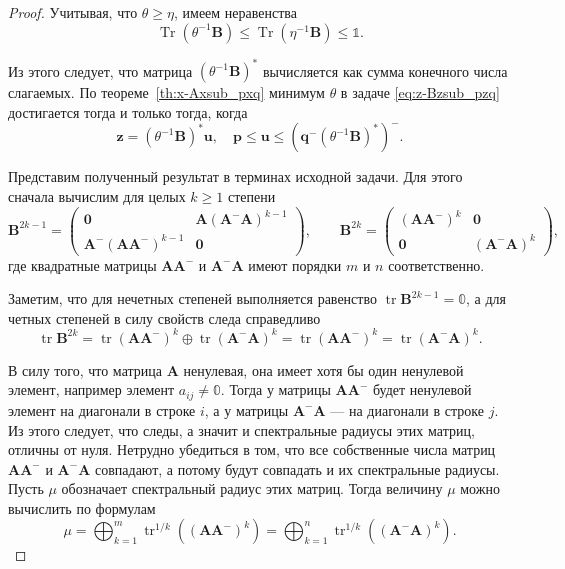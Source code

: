 \documentclass[specialist,
               substylefile = spbu.rtx,
               subf,href,colorlinks=true, 12pt]{disser}
\DeclareMathOperator{\tr}{tr}
\DeclareMathOperator{\Tr}{Tr}
\theoremstyle{definition}
\begin{document}
\begin{proof}
Учитывая, что $\theta\geq\eta$, имеем неравенства 
\begin{equation*}
\Tr(\theta^{-1}\bm{B})\leq\Tr(\eta^{-1}\bm{B})\leq\mathbb{1}.
\end{equation*}

Из этого следует, что матрица $(\theta^{-1}\bm{B})^{\ast}$ вычисляется как сумма конечного числа слагаемых. 
По теореме~\ref{th:x-Axsub_pxq} минимум $\theta$ в задаче \eqref{eq:z-Bzsub_pzq} достигается тогда и только тогда, когда 
\begin{equation}
\label{eq:z=(theta-1B)^ast_u}
\bm{z}
=
(\theta^{-1}\bm{B})^{\ast}\bm{u},
\quad
\bm{p}
\leq
\bm{u}
\leq
(\bm{q}^{-}(\theta^{-1}\bm{B})^{\ast})^{-}.
\end{equation}

Представим полученный результат в терминах исходной задачи.
Для этого сначала вычислим для целых $k\geq 1$ степени
\begin{equation}
\label{eq:B^}
\bm{B}^{2k-1}
=
\left(
\begin{array}{cc}
\bm{0} & \bm{A}(\bm{A}^{-}\bm{A})^{k-1}
\\
\bm{A}^{-}(\bm{A}\bm{A}^{-})^{k-1} & \bm{0}
\end{array}
\right),
\qquad
\bm{B}^{2k}
=
\left(
\begin{array}{cc}
(\bm{A}\bm{A}^{-})^{k} & \bm{0}
\\
\bm{0} & (\bm{A}^{-}\bm{A})^{k}
\end{array}
\right),
\end{equation}
где квадратные матрицы $\bm{A}\bm{A}^{-}$ и $\bm{A}^{-}\bm{A}$ имеют порядки $m$ и $n$ соответственно.

Заметим, что для нечетных степеней выполняется равенство $\tr\bm{B}^{2k-1}=\mathbb{0}$,
а для четных степеней в силу свойств следа справедливо
\begin{equation*}
\tr\bm{B}^{2k}
=
\tr(\bm{A}\bm{A}^{-})^{k}\oplus\tr(\bm{A}^{-}\bm{A})^{k}
=
\tr(\bm{A}\bm{A}^{-})^{k}
=
\tr(\bm{A}^{-}\bm{A})^{k}.
\end{equation*}


В силу того, что матрица $\bm{A}$ ненулевая, она имеет хотя бы один ненулевой элемент, например элемент $a_{ij}\ne\mathbb{0}$. Тогда у матрицы $\bm{A}\bm{A}^{-}$ будет ненулевой элемент на диагонали в строке $i$, а у матрицы $\bm{A}^{-}\bm{A}$ --- на диагонали в строке $j$. Из этого следует, что следы, а значит и спектральные радиусы этих  матриц, отличны от нуля. Нетрудно убедиться в том, что все собственные числа матриц $\bm{A}\bm{A}^{-}$ и $\bm{A}^{-}\bm{A}$ совпадают, а потому будут совпадать и их спектральные радиусы. Пусть $\mu$ обозначает спектральный радиус этих матриц. Тогда величину $\mu$ можно вычислить по формулам
\begin{equation*}
\mu 
=
\bigoplus_{k=1}^{m}\tr^{1/k}((\bm{A}\bm{A}^{-})^{k})
=
\bigoplus_{k=1}^{n}\tr^{1/k}((\bm{A}^{-}\bm{A})^{k}).
\end{equation*}


\end{proof}
\end{document}

